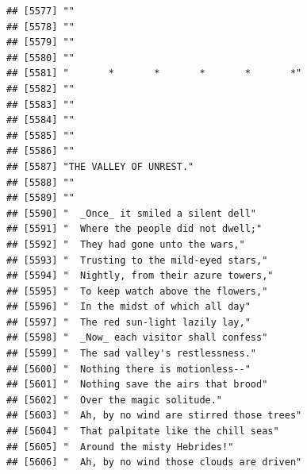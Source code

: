 \documentclass{article}\usepackage[]{graphicx}\usepackage[]{color}
\makeatletter
\newenvironment{kframe}{%
 \def\at@end@of@kframe{}%
 \ifinner\ifhmode%
  \def\at@end@of@kframe{\end{minipage}}%
  \begin{minipage}{\columnwidth}%
 \fi\fi%
 \def\FrameCommand##1{\hskip\@totalleftmargin \hskip-\fboxsep
 \colorbox{shadecolor}{##1}\hskip-\fboxsep
     \hskip-\linewidth \hskip-\@totalleftmargin \hskip\columnwidth}%
 \MakeFramed {\advance\hsize-\width
   \@totalleftmargin\z@ \linewidth\hsize
   \@setminipage}}%
 {\par\unskip\endMakeFramed%
 \at@end@of@kframe}
\newenvironment{knitrout}{}{} %
\makeatother
\begin{document}
\begin{knitrout}
\begin{kframe}
\begin{verbatim}
## [5577] ""                                                                            
## [5578] ""                                                                            
## [5579] ""                                                                            
## [5580] ""                                                                            
## [5581] "       *       *       *       *       *"                                    
## [5582] ""                                                                            
## [5583] ""                                                                            
## [5584] ""                                                                            
## [5585] ""                                                                            
## [5586] ""                                                                            
## [5587] "THE VALLEY OF UNREST."                                                       
## [5588] ""                                                                            
## [5589] ""                                                                            
## [5590] "  _Once_ it smiled a silent dell"                                            
## [5591] "  Where the people did not dwell;"                                           
## [5592] "  They had gone unto the wars,"                                              
## [5593] "  Trusting to the mild-eyed stars,"                                          
## [5594] "  Nightly, from their azure towers,"                                         
## [5595] "  To keep watch above the flowers,"                                          
## [5596] "  In the midst of which all day"                                             
## [5597] "  The red sun-light lazily lay,"                                             
## [5598] "  _Now_ each visitor shall confess"                                          
## [5599] "  The sad valley's restlessness."                                            
## [5600] "  Nothing there is motionless--"                                             
## [5601] "  Nothing save the airs that brood"                                          
## [5602] "  Over the magic solitude."                                                  
## [5603] "  Ah, by no wind are stirred those trees"                                    
## [5604] "  That palpitate like the chill seas"                                        
## [5605] "  Around the misty Hebrides!"                                                
## [5606] "  Ah, by no wind those clouds are driven"                                    

\end{verbatim}
\end{kframe}
\end{knitrout}
\end{document}
